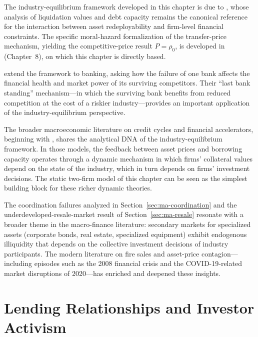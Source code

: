 \documentclass[11pt,a4paper,oneside]{book}
\theoremstyle{plain}
\theoremstyle{definition}
\theoremstyle{remark}
\numberwithin{equation}{chapter}
\begin{document}
The industry-equilibrium framework developed in this chapter is due to \citet{ShleiferVishny1992}, whose analysis of liquidation values and debt capacity remains the canonical reference for the interaction between asset redeployability and firm-level financial constraints.
The specific moral-hazard formalization of the transfer-price mechanism, yielding the competitive-price result $P = \rho_0$, is developed in \citet{Tirole2006} (Chapter~8), on which this chapter is directly based.

\citet{PerottiSuarez2002} extend the framework to banking, asking how the failure of one bank affects the financial health and market power of its surviving competitors.
Their ``last bank standing'' mechanism---in which the surviving bank benefits from reduced competition at the cost of a riskier industry---provides an important application of the industry-equilibrium perspective.

The broader macroeconomic literature on credit cycles and financial accelerators, beginning with \citet{KiyotakiMoore1997}, shares the analytical DNA of the industry-equilibrium framework.
In those models, the feedback between asset prices and borrowing capacity operates through a dynamic mechanism in which firms' collateral values depend on the state of the industry, which in turn depends on firms' investment decisions.
The static two-firm model of this chapter can be seen as the simplest building block for these richer dynamic theories.

The coordination failures analyzed in Section~\ref{sec:ma-coordination} and the underdeveloped-resale-market result of Section~\ref{sec:ma-resale} resonate with a broader theme in the macro-finance literature: secondary markets for specialized assets (corporate bonds, real estate, specialized equipment) exhibit endogenous illiquidity that depends on the collective investment decisions of industry participants.
The modern literature on fire sales and asset-price contagion---including episodes such as the 2008 financial crisis and the COVID-19-related market disruptions of 2020---has enriched and deepened these insights.


\part{Lending Relationships and Investor Activism}

\end{document}

